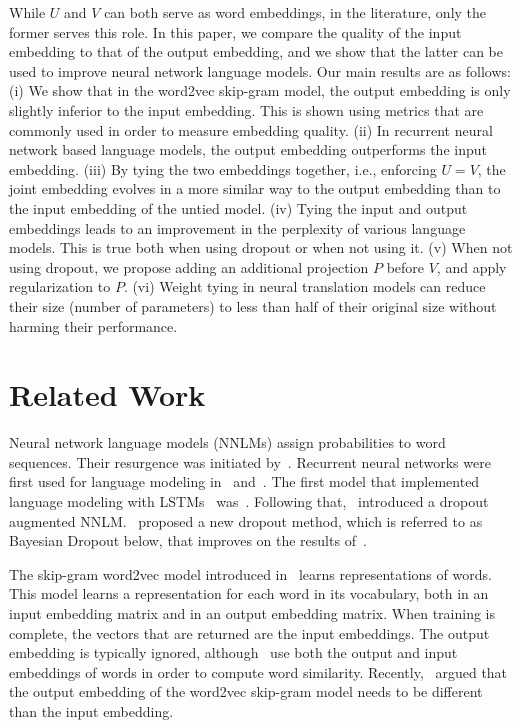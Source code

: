 \documentclass[11pt]{article}
\begin{document}
While $U$ and $V$ can both serve as word embeddings, in the literature, only the former serves this role. In this paper, we compare the quality of the input embedding to that of the output embedding, and we show that the latter can be used to improve neural network language models. Our main results are as follows:
(i) We show that in the word2vec skip-gram model, the output embedding is only slightly inferior to the input embedding. This is shown using metrics that are commonly used in order to measure embedding quality.
(ii) In recurrent neural network based language models, the output embedding outperforms the input embedding.
(iii) By tying the two embeddings together, i.e., enforcing $U=V$, the joint embedding evolves in a more similar way to the output embedding than to the input embedding of the untied model.
(iv) Tying the input and output embeddings leads to an improvement in
the perplexity of various language models. This is true both when using dropout or when not using it.
(v) When not using dropout, we propose adding an additional projection $P$ before $V$, and apply regularization to $P$. 
(vi) Weight tying in neural translation models can reduce their size (number of parameters) to less than half of their original size without harming their performance. %


\section{Related Work}

Neural network language models (NNLMs) assign probabilities to word sequences. Their resurgence was initiated by~\cite{Bengio:2003}. Recurrent neural networks were first used for language modeling in~\cite{mikolov10inters} and~\cite{Pascanu13}. The first model that implemented language modeling with LSTMs~\cite{LSTM97} was~\cite{sundermeyer12:lstm}. Following that,~\cite{zaremba14} introduced a dropout~\cite{dropout} augmented NNLM.~\cite{yarin2,yarin1} proposed a new dropout method, which is referred to as Bayesian Dropout below, that improves on the results of~\cite{zaremba14}.

The skip-gram word2vec model introduced in~\cite{word2vec,word2vec2} learns representations of words. This model learns a representation for each word in its vocabulary, both in an input embedding matrix and in an output embedding matrix. When training is complete, the vectors that are returned are the input embeddings. The output embedding is typically ignored, although~\cite{mitra2016dual,mnih2013learning} use both the output and input embeddings of words in order to compute word similarity. Recently,~\cite{yg14} argued that the output embedding of the word2vec skip-gram model needs to be different than the input embedding.
\end{document}

